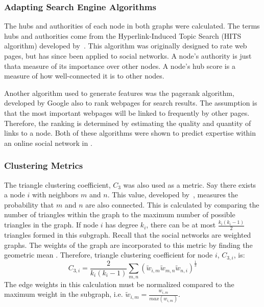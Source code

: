 \documentclass[12pt]{report}
\begin{document}
\subsubsection{Adapting Search Engine Algorithms}

The hubs and authorities of each node in both graphs were calculated.
The terms hubs and authorities come from the Hyperlink-Induced Topic Search (HITS algorithm) developed by~\cite{kleinberg_hubs_1999}.
This algorithm was originally designed to rate web pages, but has since been applied to social networks.
A node's authority is just that\textemdash{}a measure of its importance over other nodes.
A node's hub score is a measure of how well-connected it is to other nodes.

Another algorithm used to generate features was the pagerank algorithm, developed by Google \cite{page_pagerank_1999} also to rank webpages for search results.
The assumption is that the most important webpages will be linked to frequently by other pages.
Therefore, the ranking is determined by estimating the quality and quantity of links to a node.
Both of these algorithms were shown to predict expertise within an online social network in \cite{zhang_expertise_2007}.

\subsubsection{Clustering Metrics}
The triangle clustering coefficient, $C_3$ was also used as a metric.
Say there exists a node $i$ with neighbors $m$ and $n$.
This value, developed by~\cite{saramaki_generalizations_2007}, measures the probability that $m$ and $n$ are also connected.
This is calculated by comparing the number of triangles within the graph to the maximum number of possible triangles in the graph.  If node $i$ has degree $k_i$, there can be at most $\frac{k_i(k_i-1)}{2}$ triangles formed in this subgraph.  Recall that the social networks are weighted graphs.  The weights of the graph are incorporated to this metric by finding the geometric mean \cite{zhang_expertise_2007}.   Therefore, triangle clustering coefficient for node $i$, $C_{3,i}$, is:
\begin{equation}
C_{3,i} = \frac{2}{k_i(k_i-1)}\sum_{m,n}(\tilde{w}_{i,m}\tilde{w}_{m,n}\tilde{w}_{n,i})^\frac{1}{3}
\end{equation}
The edge weights in this calculation must be normalized compared to the maximum weight in the subgraph, i.e. $\tilde{w}_{i,m} = \frac{w_{i,m}}{max(w_{i,m})}$.
\end{document}
